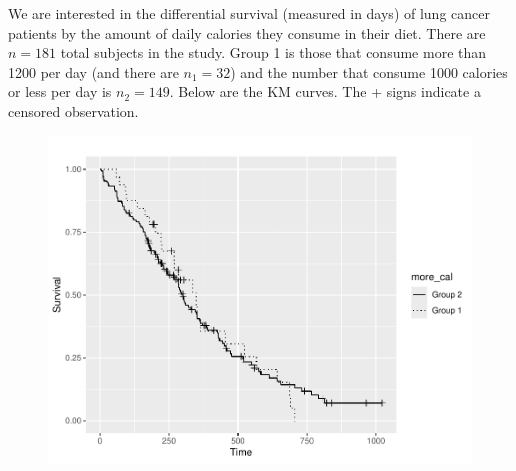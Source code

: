 \documentclass[12pt]{article}
\begin{document}
\pagebreak

\problem We are interested in the differential survival (measured in days) of lung cancer patients by the amount of daily calories they consume in their diet. There are $n = 181$ total subjects in the study. Group 1 is those that consume more than 1200 per day (and there are $n_1 = 32$) and the number that consume 1000 calories or less per day is $n_2 = 149$. Below are the KM curves. The + signs indicate a censored observation.

\vspace{-0.4cm}
\begin{figure}[h]
    \centering
    \includegraphics[width=6.0in]{kms.pdf}
    \label{fig:enter-label}
\end{figure}
\FloatBarrier
\end{document}
